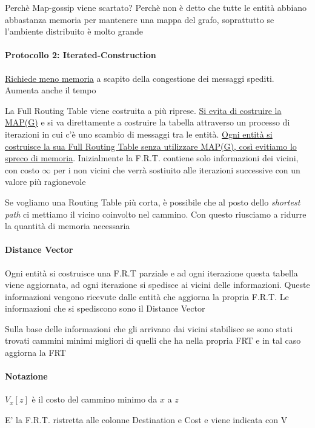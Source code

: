 Perchè Map-gossip viene scartato? Perchè non è detto che tutte le entità abbiano abbastanza memoria per mantenere una mappa del grafo, soprattutto se l'ambiente distribuito è molto grande

\paragraph{Protocollo 2: Iterated-Construction}
\uline{Richiede meno memoria} a scapito della congestione dei messaggi spediti. Aumenta anche il tempo

La Full Routing Table viene costruita a più riprese. \uline{Si evita di costruire la MAP(G)} e si va direttamente a costruire la tabella attraverso un processo di iterazioni in cui c'è uno scambio di messaggi tra le entità. \uline{Ogni entità si costruisce la sua Full Routing Table senza utilizzare MAP(G), così evitiamo lo spreco di memoria}. Inizialmente la F.R.T. contiene solo informazioni dei vicini, con costo $\infty$ per i non vicini che verrà sostiuito alle iterazioni successive con un valore più ragionevole

\begin{osservazione}
    Se vogliamo una Routing Table più corta, è possibile che al posto dello \textit{shortest path} ci mettiamo il vicino coinvolto nel cammino. Con questo riusciamo a ridurre la quantità di memoria necessaria
\end{osservazione}

\paragraph{Distance Vector}
Ogni entità si costruisce una F.R.T parziale e ad ogni iterazione questa tabella viene aggiornata, ad ogni iterazione si spedisce ai vicini delle informazioni. Queste informazioni vengono ricevute dalle entità che aggiorna la propria F.R.T. Le informazioni che si spediscono sono il Distance Vector

Sulla base delle informazioni che gli arrivano dai vicini stabilisce se sono stati trovati cammini minimi migliori di quelli che ha nella propria FRT e in tal caso aggiorna la FRT

\paragraph{Notazione} $V_x[z]$ è il costo del cammino minimo da $x$ a $z$

\begin{definizione}
    E' la F.R.T. ristretta alle colonne Destination e Cost e viene indicata con V
\end{definizione}

